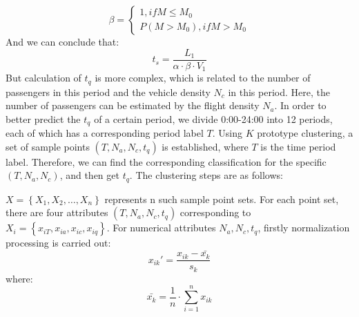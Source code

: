 \begin{equation}
	\beta = \left\{\begin{matrix}
	1, if M \leq  M_{0}\\ 
	P(M>M_{0}),if M > M_{0}
	\end{matrix}\right.
\label{beta}
\end{equation}
And we can conclude that:
\begin{equation}
	t_{s} = \frac{L_{1}}{\alpha \cdot \beta \cdot V_{1}}
\label{t_s}
\end{equation}
But calculation of $t_{q}$ is more complex, which is related to the number of passengers in this period and the vehicle density $N_{c}$ in this period. Here, the number of passengers can be estimated by the flight density $N_{a}$. In order to better predict the $t_{q}$ of a certain period, we divide 0:00-24:00 into 12 periods, each of which has a corresponding period label $T$. Using $K$ prototype clustering\cite{huang1998extensions}, a set of sample points $(T, N_{a}, N_{c}, t_{q})$ is established, where $T$ is the time period label. Therefore, we can find the corresponding classification for the specific $(T, N_{a}, N_{c})$, and then get $t_{q}$. The clustering steps are as follows:

$X=\left \{ X_{1},X_{2},…,X_{n}\right \}$ represents n such sample point sets. For each point set, there are four attributes $(T, N_{a}, N_{c}, t_{q})$ corresponding to $X_{i} = \left \{ x_{iT}, x_{ia}, x_{ic}, x_{iq}\right \}$. For numerical attributes $N_{a}, N_{c}, t_{q}$, firstly normalization processing is carried out:
\begin{equation}
	{x_{ik}}' =\frac{x_{ik}-\bar{x_{k}}}{s_{k}}
\label{x_ik'}
\end{equation}
where:
\begin{equation}
	\bar{x_{k}} = \frac{1}{n} \cdot \sum_{i=1}^{n}x_{ik}
\label{x_k_bar}
\end{equation}

